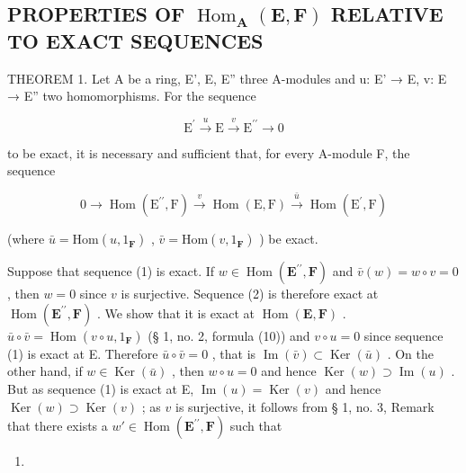 \subsection{\texorpdfstring{PROPERTIES OF \(\operatorname{Hom}_{\mathbf{A}}(\mathbf{E}, \mathbf{F})\) RELATIVE TO EXACT SEQUENCES}{PROPERTIES OF \textbackslash operatorname\{Hom\}\_\{\textbackslash mathbf\{A\}\}(\textbackslash mathbf\{E\}, \textbackslash mathbf\{F\}) RELATIVE TO EXACT SEQUENCES}}

THEOREM 1. Let A be a ring, E', E, E'' three A-modules and u: E' → E, v: E → E'' two homomorphisms. For the sequence

\[
\mathrm{E} ^ {\prime} \stackrel {u} {\longrightarrow} \mathrm{E} \stackrel {v} {\longrightarrow} \mathrm{E} ^ {\prime \prime} \longrightarrow 0\tag{1}
\]

to be exact, it is necessary and sufficient that, for every A-module F, the sequence

\[
0 \longrightarrow \operatorname{Hom} (\mathrm{E} ^ {\prime \prime}, \mathrm{F}) \stackrel {v} {\longrightarrow} \operatorname{Hom} (\mathrm{E}, \mathrm{F}) \stackrel {\bar {u}} {\longrightarrow} \operatorname{Hom} (\mathrm{E} ^ {\prime}, \mathrm{F})\tag{2}
\]

(where \(\bar{u} = \mathrm{Hom}(u, 1_{\mathbf{F}})\) , \(\bar{v} = \mathrm{Hom}(v, 1_{\mathbf{F}})\) ) be exact.

Suppose that sequence (1) is exact. If \(w \in \operatorname{Hom}(\mathbf{E}^{\prime \prime}, \mathbf{F})\) and \(\bar{v}(w) = w \circ v = 0\) , then \(w = 0\) since \(v\) is surjective. Sequence (2) is therefore exact at \(\operatorname{Hom}(\mathbf{E}^{\prime \prime}, \mathbf{F})\) . We show that it is exact at \(\operatorname{Hom}(\mathbf{E}, \mathbf{F})\) . \(\bar{u} \circ \bar{v} = \operatorname{Hom}(v \circ u, 1_{\mathbf{F}})\) (§ 1, no. 2, formula (10)) and \(v \circ u = 0\) since sequence (1) is exact at E. Therefore \(\bar{u} \circ \bar{v} = 0\) , that is \(\operatorname{Im}(\bar{v}) \subset \operatorname{Ker}(\bar{u})\) . On the other hand, if \(w \in \operatorname{Ker}(\bar{u})\) , then \(w \circ u = 0\) and hence \(\operatorname{Ker}(w) \supset \operatorname{Im}(u)\) . But as sequence (1) is exact at E, \(\operatorname{Im}(u) = \operatorname{Ker}(v)\) and hence \(\operatorname{Ker}(w) \supset \operatorname{Ker}(v)\) ; as \(v\) is surjective, it follows from § 1, no. 3, Remark that there exists a \(w' \in \operatorname{Hom}(\mathbf{E}^{\prime \prime}, \mathbf{F})\) such that

\begin{enumerate}
\def\labelenumi{(\arabic{enumi})}
\setcounter{enumi}{3}
\tightlist
\item
\end{enumerate}

